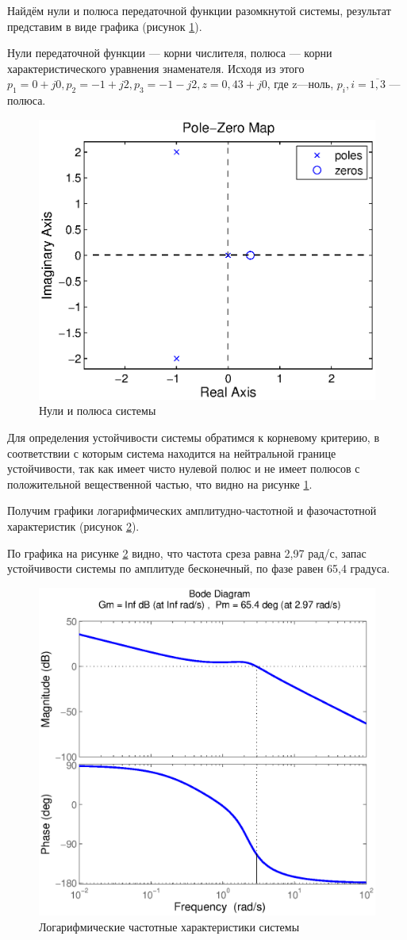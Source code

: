 \documentclass[12pt,a4paper]{article}
\begin{document}
Найдём нули и полюса передаточной функции разомкнутой системы, результат представим в виде графика (рисунок \ref{pzmap}).\par
Нули передаточной функции --- корни числителя, полюса --- корни характеристического уравнения знаменателя. Исходя из этого $p_1=0+j0, p_2=-1+j2, p_3=-1-j2, z=0,43+j0$, где z---ноль, $p_i, i = \overline{1,3}$ --- полюса.
\begin{figure}[ht!]
	\centering
	\includegraphics[width=0.8\linewidth]{pzmap}
	\caption{Нули и полюса системы}
	\label{pzmap}
\end{figure}\par
Для определения устойчивости системы обратимся к корневому критерию, в соответствии с которым система находится на нейтральной границе устойчивости, так как имеет чисто нулевой полюс и не имеет полюсов с положительной вещественной частью, что видно на рисунке \ref{pzmap}.

Получим графики логарифмических амплитудно-частотной и фазочастотной характеристик (рисунок \ref{bode}).\par
По графика на рисунке \ref{bode} видно, что частота среза равна 2,97 рад/с, запас устойчивости системы по амплитуде бесконечный, по фазе равен 65,4 градуса.
\begin{figure}[H]
	\centering
	\includegraphics[width=0.65\linewidth]{bode}
	\caption{Логарифмические частотные характеристики системы}
	\label{bode}
\end{figure}
\end{document}
